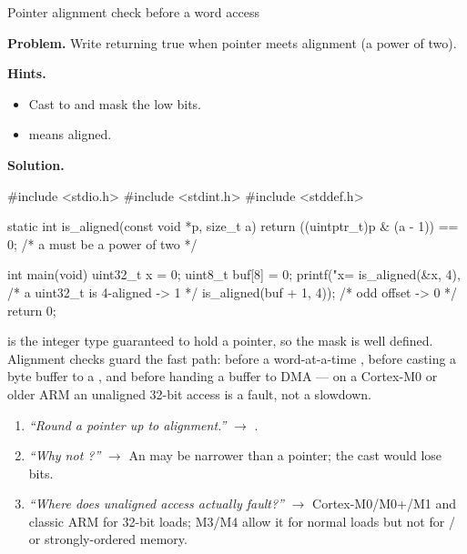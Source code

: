\begin{gymproblem}{Pointer alignment check before a word access}

\textbf{Problem.} Write  returning true when pointer
 meets alignment  (a power of two).

\textbf{Hints.}
\begin{itemize}
\item Cast to  and mask the low bits.
\item {} means aligned.
\end{itemize}

\attempt

\textbf{Solution.}
\begin{cgym}
#include <stdio.h>
#include <stdint.h>
#include <stddef.h>

static int is_aligned(const void *p, size_t a) {
    return ((uintptr_t)p & (a - 1)) == 0;   /* a must be a power of two */
}

int main(void) {
    uint32_t x = 0;
    uint8_t  buf[8] = {0};
    printf("x=%
           is_aligned(&x, 4),        /* a uint32_t is 4-aligned -> 1 */
           is_aligned(buf + 1, 4));  /* odd offset -> 0              */
    return 0;
}
\end{cgym}

 is the integer type guaranteed to hold a pointer, so the
mask is well defined. Alignment checks guard the fast path: before a
word-at-a-time , before casting a byte buffer to a
, and before handing a buffer to DMA --- on a Cortex-M0 or
older ARM an unaligned 32-bit access is a fault, not a slowdown.

\followups
\begin{enumerate}
\item \emph{``Round a pointer up to alignment.''} $\rightarrow$
  .
\item \emph{``Why  not ?''} $\rightarrow$ An
   may be narrower than a pointer; the cast would lose bits.
\item \emph{``Where does unaligned access actually fault?''} $\rightarrow$
  Cortex-M0/M0+/M1 and classic ARM for 32-bit loads; M3/M4 allow it for normal
  loads but not for / or strongly-ordered memory.
\end{enumerate}
\end{gymproblem}

